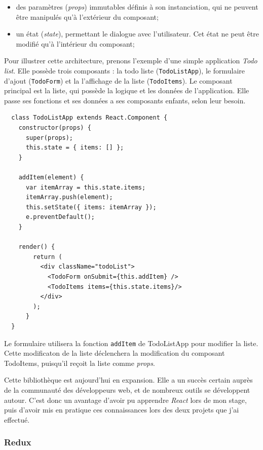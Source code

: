 \documentclass[12pt,a4paper]{article}
\providecommand{\tightlist}{%
  \setlength{\itemsep}{0pt}\setlength{\parskip}{0pt}}
\begin{document}
  \begin{itemize}
  \tightlist
  \item
    des paramètres (\emph{props}) immutables définis à son instanciation,
    qui ne peuvent être manipulés qu'à l'extérieur du composant;
  \item
    un état (\emph{state}), permettant le dialogue avec l'utilisateur. Cet
    état ne peut être modifié qu'à l'intérieur du composant;
  \end{itemize}

  \bigskip

  Pour illustrer cette architecture, prenons l'exemple d'une simple
  application \emph{Todo list}. Elle possède trois composants : la todo
  liste (\texttt{TodoListApp}), le formulaire d'ajout (\texttt{TodoForm})
  et la l'affichage de la liste (\texttt{TodoItems}). Le composant
  principal est la liste, qui possède la logique et les données de
  l'application. Elle passe ses fonctions et ses données a ses composants
  enfants, selon leur besoin.

  \begin{verbatim}
  class TodoListApp extends React.Component {
    constructor(props) {
      super(props);
      this.state = { items: [] };
    }

    addItem(element) {
      var itemArray = this.state.items;
      itemArray.push(element);
      this.setState({ items: itemArray });
      e.preventDefault();
    }

    render() {
        return (
          <div className="todoList">
            <TodoForm onSubmit={this.addItem} />
            <TodoItems items={this.state.items}/>
          </div>
        );
      }
  }
  \end{verbatim}

  Le formulaire utilisera la fonction \texttt{addItem} de TodoListApp pour
  modifier la liste. Cette modificaton de la liste déclenchera la
  modification du composant TodoItems, puisqu'il reçoit la liste comme
  \emph{props}.

  \bigskip

  Cette bibliothèque est aujourd'hui en expansion. Elle a un succès
  certain auprès de la communauté des développeurs web, et de nombreux
  outils se développent autour. C'est donc un avantage d'avoir pu
  apprendre \emph{React} lors de mon stage, puis d'avoir mis en pratique
  ces connaissances lors des deux projets que j'ai effectué.

  \bigskip

  \subsubsection{Redux}\label{redux}
\end{document}

